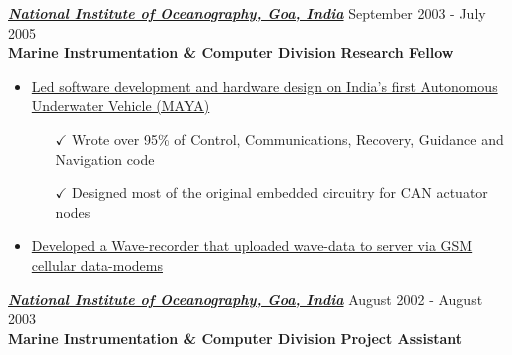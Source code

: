    \vspace{-6pt}
 
{\sl \href{http://nio.org}{\textbf{National Institute of Oceanography, Goa, India}}}       \hfill               September 2003 - July 2005 \\[2pt]
\textbf{Marine Instrumentation \& Computer Division} \hfill \textbf{Research Fellow}
 \begin{itemize} 
 \item  \href{http://robotics.usc.edu/~ampereir/wordpress/?page_id=425}{Led software development and hardware design on India's first Autonomous Underwater Vehicle (MAYA)}
 \begin{itemize} 
 \item[$\checkmark$] Wrote over 95\% of Control, Communications, Recovery, Guidance and Navigation code
  \iftoggle{detailedVersion}{\begin{itemize}
   \item[\tiny$\blacksquare$]  Required Control Systems, Robotics, Computer Networking
   \item[\tiny$\blacksquare$]  Coded in C++ (Linux), Visual C++ (Windows) for Control GUI, C (micro controllers)and Matlab for prototyping
   \end{itemize}}{}
    \item[$\checkmark$] Designed most of the original embedded circuitry for CAN actuator nodes
 \end{itemize}
 
 \item  \href{http://robotics.usc.edu/~ampereir/wordpress/?page_id=382}{Developed a Wave-recorder that uploaded wave-data to server via GSM cellular data-modems}
 \iftoggle{detailedVersion}{
 \begin{itemize}
 \item[$\checkmark$] One of the earliest GSM-enabled instruments in Oceanography
  \begin{itemize}
   \item[\tiny$\blacksquare$]  Code written in C (Embedded), Visual C++ for Windows-based GUI 
   \item[\tiny$\blacksquare$]  Hardware design involved PCB layout software (Eagle)
   \end{itemize}
 \end{itemize}}{}
 \end{itemize}
 
{\sl \href{http://nio.org}{\textbf{National Institute of Oceanography, Goa, India}}}       \hfill               August 2002 - August 2003 \\[2pt]
\textbf{Marine Instrumentation \& Computer Division} \hfill \textbf{Project Assistant}

